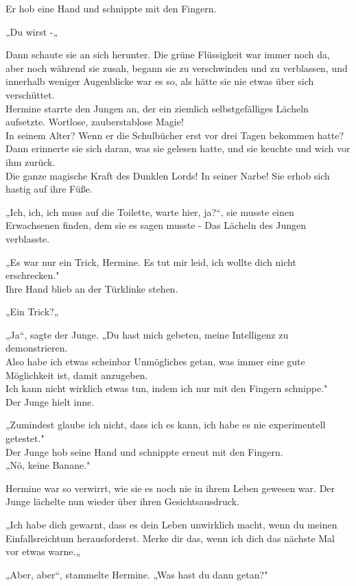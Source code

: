 {Er hob eine Hand und schnippte mit den Fingern.

„Du wirst -„

Dann schaute sie an sich herunter. Die grüne Flüssigkeit war immer noch da, aber noch während sie zusah, begann sie zu verschwinden und zu verblassen, und innerhalb weniger Augenblicke war es so, als hätte sie nie etwas über sich verschüttet.\\ Hermine starrte den Jungen an, der ein ziemlich selbstgefälliges Lächeln aufsetzte. Wortlose, zauberstablose Magie!\\ In seinem Alter? Wenn er die Schulbücher erst vor drei Tagen bekommen hatte? Dann erinnerte sie sich daran, was sie gelesen hatte, und sie keuchte und wich vor ihm zurück.\\ Die ganze magische Kraft des Dunklen Lords! In seiner Narbe! Sie erhob sich hastig auf ihre Füße.

„Ich, ich, ich muss auf die Toilette, warte hier, ja?“, sie musste einen Erwachsenen finden, dem sie es sagen musste - Das Lächeln des Jungen verblasste.

„Es war nur ein Trick, Hermine. Es tut mir leid, ich wollte dich nicht erschrecken."\\ Ihre Hand blieb an der Türklinke stehen.

„Ein Trick?„

„Ja“, sagte der Junge. „Du hast mich gebeten, meine Intelligenz zu demonstrieren.\\ Also habe ich etwas scheinbar Unmögliches getan, was immer eine gute Möglichkeit ist, damit anzugeben.\\ Ich kann nicht wirklich etwas tun, indem ich nur mit den Fingern schnippe."\\ Der Junge hielt inne.

„Zumindest glaube ich nicht, dass ich es kann, ich habe es nie experimentell getestet."\\ Der Junge hob seine Hand und schnippte erneut mit den Fingern.\\ „Nö, keine Banane."

Hermine war so verwirrt, wie sie es noch nie in ihrem Leben gewesen war. Der Junge lächelte nun wieder über ihren Gesichtsausdruck.

„Ich habe dich gewarnt, dass es dein Leben unwirklich macht, wenn du meinen Einfallsreichtum herausforderst. Merke dir das, wenn ich dich das nächste Mal vor etwas warne.„

„Aber, aber“, stammelte Hermine. „Was hast du dann getan?"

}
